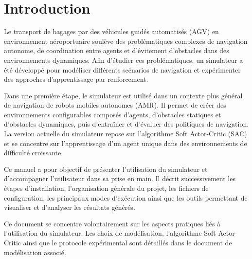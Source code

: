 \section*{ Introduction }

\noindent Le transport de bagages par des véhicules guidés automatisés (AGV) en environnement aéroportuaire soulève des problématiques complexes de navigation autonome, de coordination entre agents et d'évitement d'obstacles dans des environnements dynamiques. Afin d'étudier ces problématiques, un simulateur a été développé pour modéliser différents scénarios de navigation et expérimenter des approches d'apprentissage par renforcement.

\vspace{10pt}

\noindent Dans une première étape, le simulateur est utilisé dans un contexte plus général de navigation de robots mobiles autonomes (AMR). Il permet de créer des environnements configurables composés d'agents, d'obstacles statiques et d'obstacles dynamiques, puis d'entraîner et d'évaluer des politiques de navigation. La version actuelle du simulateur repose sur l'algorithme Soft Actor-Critic (SAC) et se concentre sur l'apprentissage d'un agent unique dans des environnements de difficulté croissante.

\vspace{10pt}

\noindent Ce manuel a pour objectif de présenter l'utilisation du simulateur et d'accompagner l'utilisateur dans sa prise en main. Il décrit successivement les étapes d'installation, l'organisation générale du projet, les fichiers de configuration, les principaux modes d'exécution ainsi que les outils permettant de visualiser et d'analyser les résultats générés.


\vspace{10pt}

\noindent Ce document se concentre volontairement sur les aspects pratiques liés à l'utilisation du simulateur. Les choix de modélisation, l'algorithme Soft Actor-Critic ainsi que le protocole expérimental sont détaillés dans le document de modélisation associé.
